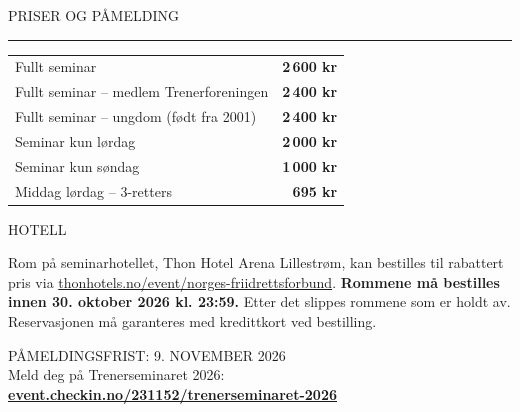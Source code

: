 \vspace{14pt}
{\kickfont\small\color{aksent}PRISER OG PÅMELDING\par}\vspace{3pt}
{\noindent\color{aksent}\rule{22mm}{2.4pt}\par}\vspace{8pt}
\label{sem:pris}
\begin{tcolorbox}[enhanced,colback=bakgrunn,colframe=bakgrunn,arc=0pt,boxrule=0pt,left=12pt,right=12pt,top=8pt,bottom=8pt]
\sffamily\small\renewcommand{\arraystretch}{1.5}
\begin{tabular*}{\linewidth}{@{\extracolsep{\fill}}lr@{}}
Fullt seminar & \textbf{2\,600 kr}\\
Fullt seminar – medlem Trenerforeningen & \textbf{2\,400 kr}\\
Fullt seminar – ungdom (født fra 2001) & \textbf{2\,400 kr}\\
Seminar kun lørdag & \textbf{2\,000 kr}\\
Seminar kun søndag & \textbf{1\,000 kr}\\
Middag lørdag – 3-retters & \textbf{695 kr}\\
\end{tabular*}
\end{tcolorbox}
\vspace{8pt}
\begin{tcolorbox}[enhanced,colback=white,colframe=hovedbla,boxrule=0.8pt,arc=0pt,left=12pt,right=12pt,top=7pt,bottom=7pt]
{\kickfont\small\color{hovedbla}HOTELL}\par\vspace{3pt}
{\sffamily\small Rom på seminarhotellet, Thon Hotel Arena Lillestrøm, kan bestilles til rabattert pris via \href{https://www.thonhotels.no/event/norges-friidrettsforbund/}{thonhotels.no/event/norges-friidrettsforbund}. \textbf{Rommene må bestilles innen 30. oktober 2026 kl. 23:59.} Etter det slippes rommene som er holdt av. Reservasjonen må garanteres med kredittkort ved bestilling.\par}
\end{tcolorbox}
\vspace{8pt}
\begin{tcolorbox}[enhanced,colback=aksent,colframe=aksent,arc=0pt,boxrule=0pt,left=14pt,right=14pt,top=10pt,bottom=10pt]
{\kickfont\large\color{white}PÅMELDINGSFRIST: 9. NOVEMBER 2026}\\[1pt]{\sffamily\small\color{white}Meld deg på Trenerseminaret 2026:}\\[3pt]{\sffamily\bfseries\normalsize\color{white}\href{https://event.checkin.no/231152/trenerseminaret-2026}{event.checkin.no/231152/trenerseminaret-2026}}
\end{tcolorbox}
\clearpage
\endgroup\twocolumn
